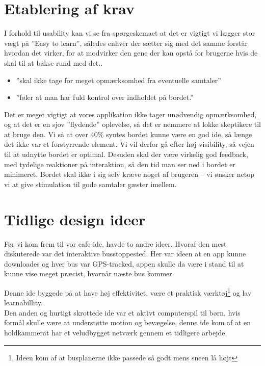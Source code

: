 \documentclass{article}
\begin{document}
\section{Etablering af krav}
    I forhold til usability kan vi se fra spørgeskemaet at det er vigtigt vi lægger stor vægt på ”Easy to learn”, således enhver der sætter sig med det samme forstår hvordan det virker, for at modvirker den gene der kan opstå for brugerne hvis de skal til at bakse rund med det..
    \begin{itemize}
    
        \item ”skal ikke tage for meget opmærksomhed fra eventuelle samtaler”
        \item ”føler at man har fuld kontrol over indholdet på bordet.”
            
    \end{itemize}
    Det er meget vigtigt at vores applikation ikke tager unødvendig opmærksomhed, og at det er en sjov ”flydende” oplevelse, så det er nemmere at lokke skeptikere til at bruge den. Vi så at over 40\% syntes bordet kunne være en god ide, så længe det ikke var et forstyrrende element. Vi vil derfor gå efter høj visibility, så vejen til at udnytte bordet er optimal. Desuden skal der være virkelig god feedback, med tydelige reaktioner på interaktion, så den tid man ser ned i bordet er minimeret. Bordet skal ikke i sig selv kræve noget af brugeren – vi ønsker netop vi at give stimulation til gode samtaler gæster imellem.

\section{Tidlige design ideer}
    Før vi kom frem til vor cafe-ide, havde to andre ideer. Hvoraf den mest diskuterede var det interaktive busstoppested. Her var ideen at en app kunne downloades og hver bus var GPS-tracked, appen skulle da være i stand til at kunne vise meget præcist, hvornår næste bus kommer.
    
    Denne ide byggede på at have høj effektivitet, være et praktisk værktøj\footnote{Ideen kom af at busplanerne ikke passede så godt mens sneen lå højt} og lav learnabillity.\\

    Den anden og hurtigt skrottede ide var et aktivt computerspil til børn, hvis formål skulle være at understøtte motion og bevægelse, denne ide kom af at en holdkammerat har et veludbygget netværk gennem et tidligere arbejde.
    
\end{document}
